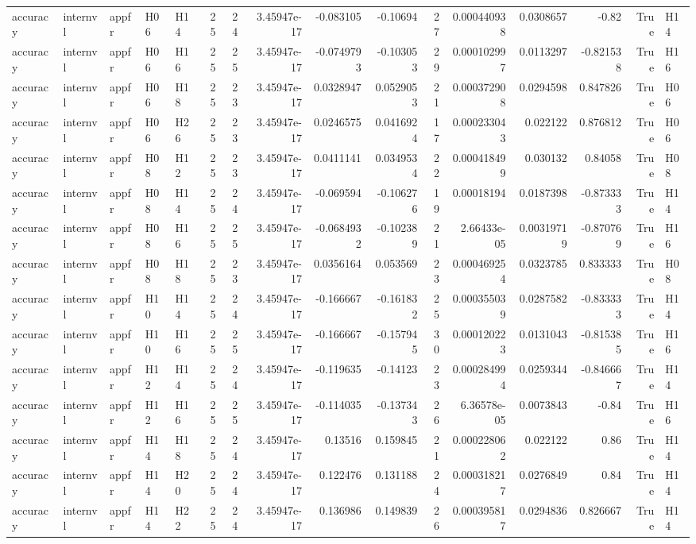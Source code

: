\begin{longtable}{lllllrrrrrrrrrrl}
accuracy & internvl & appfr & H06 & H14 & 25 & 24 & 3.45947e-17 & -0.083105 & -0.10694 & 27 & 0.000440938 & 0.0308657 & -0.82 & True & H14 \\
accuracy & internvl & appfr & H06 & H16 & 25 & 25 & 3.45947e-17 & -0.0749793 & -0.103053 & 29 & 0.000102997 & 0.0113297 & -0.821538 & True & H16 \\
accuracy & internvl & appfr & H06 & H18 & 25 & 23 & 3.45947e-17 & 0.0328947 & 0.0529053 & 21 & 0.000372908 & 0.0294598 & 0.847826 & True & H06 \\
accuracy & internvl & appfr & H06 & H26 & 25 & 23 & 3.45947e-17 & 0.0246575 & 0.0416924 & 17 & 0.000233043 & 0.022122 & 0.876812 & True & H06 \\
accuracy & internvl & appfr & H08 & H12 & 25 & 23 & 3.45947e-17 & 0.0411141 & 0.0349534 & 22 & 0.000418499 & 0.030132 & 0.84058 & True & H08 \\
accuracy & internvl & appfr & H08 & H14 & 25 & 24 & 3.45947e-17 & -0.069594 & -0.106276 & 19 & 0.00018194 & 0.0187398 & -0.873333 & True & H14 \\
accuracy & internvl & appfr & H08 & H16 & 25 & 25 & 3.45947e-17 & -0.0684932 & -0.102389 & 21 & 2.66433e-05 & 0.00319719 & -0.870769 & True & H16 \\
accuracy & internvl & appfr & H08 & H18 & 25 & 23 & 3.45947e-17 & 0.0356164 & 0.053569 & 23 & 0.000469254 & 0.0323785 & 0.833333 & True & H08 \\
accuracy & internvl & appfr & H10 & H14 & 25 & 24 & 3.45947e-17 & -0.166667 & -0.161832 & 25 & 0.000355039 & 0.0287582 & -0.833333 & True & H14 \\
accuracy & internvl & appfr & H10 & H16 & 25 & 25 & 3.45947e-17 & -0.166667 & -0.157945 & 30 & 0.000120223 & 0.0131043 & -0.815385 & True & H16 \\
accuracy & internvl & appfr & H12 & H14 & 25 & 24 & 3.45947e-17 & -0.119635 & -0.14123 & 23 & 0.000284994 & 0.0259344 & -0.846667 & True & H14 \\
accuracy & internvl & appfr & H12 & H16 & 25 & 25 & 3.45947e-17 & -0.114035 & -0.137343 & 26 & 6.36578e-05 & 0.0073843 & -0.84 & True & H16 \\
accuracy & internvl & appfr & H14 & H18 & 25 & 24 & 3.45947e-17 & 0.13516 & 0.159845 & 21 & 0.000228062 & 0.022122 & 0.86 & True & H14 \\
accuracy & internvl & appfr & H14 & H20 & 25 & 24 & 3.45947e-17 & 0.122476 & 0.131188 & 24 & 0.000318217 & 0.0276849 & 0.84 & True & H14 \\
accuracy & internvl & appfr & H14 & H22 & 25 & 24 & 3.45947e-17 & 0.136986 & 0.149839 & 26 & 0.000395817 & 0.0294836 & 0.826667 & True & H14 \\

\end{longtable}
